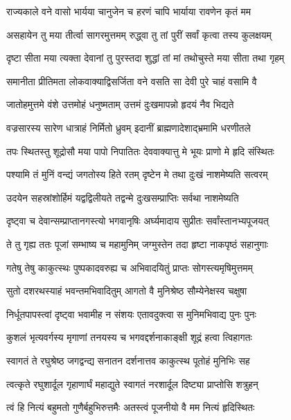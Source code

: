 \twolineshloka
{राज्यकाले वने वासो भार्यया चानुजेन च}
{हरणं चापि भार्याया रावणेन कृतं मम}%

\twolineshloka
{असहायेन तु मया तीर्त्वा सागरमुत्तमम्}
{रुद्ध्वा तु तां पुरीं सर्वां कृत्वा तस्य कुलक्षयम्}%

\twolineshloka
{दृष्टा सीता मया त्यक्ता देवानां तु पुरस्तदा}
{शुद्धां तां मां तथोचुस्ते मया सीता तथा गृहम्}%

\twolineshloka
{समानीता प्रीतिमता लोकवाक्याद्विसर्जिता}
{वने वसति सा देवी पुरे चाहं वसामि वै}%

\twolineshloka
{जातोहमुत्तमे वंशे उत्तमोहं धनुष्मताम्}
{उत्तमं दुःखमापन्नो हृदयं नैव भिद्यते}%

\twolineshloka
{वज्रसारस्य सारेण धात्राहं निर्मितो ध्रुवम्}
{इदानीं ब्राह्मणादेशाद्भ्रमामि धरणीतले}%

\twolineshloka
{तपः स्थितस्तु शूद्रोसौ मया पापो निपातितः}
{देववाक्यात्तु मे भूयः प्राणो मे हृदि संस्थितः}%

\twolineshloka
{पश्यामि तं मुनिं वन्द्यं जगतोस्य हिते रतम्}
{दृष्टेन मे तथा दुःखं नाशमेष्यति सत्वरम्}%

\twolineshloka
{उदयेन सहस्रांशोर्हिमं यद्वद्विलीयते}
{तद्वन्मे दुःखसम्प्राप्तिः सर्वथा नाशमेष्यति}%

\twolineshloka
{दृष्ट्वा च देवान्सम्प्राप्तानगस्त्यो भगवानृषिः}
{अर्घ्यमादाय सुप्रीतः सर्वांस्तानभ्यपूजयत्}%

\twolineshloka
{ते तु गृह्य ततः पूजां सम्भाष्य च महामुनिम्}
{जग्मुस्तेन तदा हृष्टा नाकपृष्ठं सहानुगाः}%

\twolineshloka
{गतेषु तेषु काकुत्स्थः पुष्पकादवरुह्य च}
{अभिवादयितुं प्राप्तः सोगस्त्यमृषिमुत्तमम्}%


\twolineshloka
{सुतो दशरथस्याहं भवन्तमभिवादितुम्}
{आगतो वै मुनिश्रेष्ठ सौम्येनेक्षस्व चक्षुषा}%

\twolineshloka
{निर्धूतपापस्त्वां दृष्ट्वा भवामीह न संशयः}
{एतावदुक्त्वा स मुनिमभिवाद्य पुनः पुनः}%

\twolineshloka
{कुशलं भृत्यवर्गस्य मृगाणां तनयस्य च}
{भगवद्दर्शनाकाङ्क्षी शूद्रं हत्वा त्विहागतः}%


\twolineshloka
{स्वागतं ते रघुश्रेष्ठ जगद्वन्द्य सनातन}
{दर्शनात्तव काकुत्स्थ पूतोहं मुनिभिः सह}%

\twolineshloka
{त्वत्कृते रघुशार्दूल गृहाणार्घं महाद्युते}
{स्वागतं नरशार्दूल दिष्ट्या प्राप्तोसि शत्रुहन्}%

\twolineshloka
{त्वं हि नित्यं बहुमतो गुणैर्बहुभिरुत्तमैः}
{अतस्त्वं पूजनीयो वै मम नित्यं हृदिस्थितः}%

